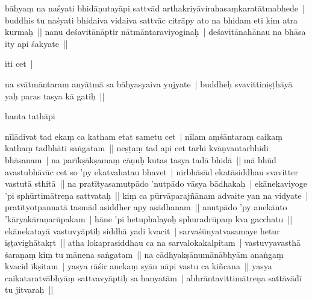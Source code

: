\documentclass[article,12pt,a4paper]{memoir}%
\newcounter{parCount}
\begin{document}
	  
	  \pstart \leavevmode%
	bāhyaṃ na naśyati bhidāṇutayāpi sattvād arthakriyāvirahasaṃkaratātmabhede | buddhis tu naśyati bhidaiva vidaiva sattvāc citrāpy ato na bhidam eti kim atra kurmaḥ ||  nanu deśavitānāptir nātmāntaraviyoginaḥ | deśavitānahānau na bhāsa ity api śakyate ||
	{}
	\pend%
      

	  
	  \pstart \leavevmode%
	iti cet |
	{}
	\pend%
      

	  
	  \pstart \leavevmode%
	na svātmāntaram anyātmā sa bāhyasyaiva yujyate | buddheḥ svavittiniṣṭhāyā yaḥ paras tasya kā gatiḥ || 
	{}
	\pend%
      

	  
	  \pstart \leavevmode%
	hanta tathāpi
	{}
	\pend%
      

	  
	  \pstart \leavevmode%
	nīlādivat tad ekaṃ ca katham etat sametu cet | nīlam aṃśāntaraṃ caikaṃ kathaṃ tadbhāti saṅgatam || neṣṭaṃ tad api cet tarhi kvāṇvantarbhidi bhāsanam | na parīkṣākṣamaṃ cāṇuḥ kutas tasya tadā bhidā || mā bhūd avastubhāvāc cet so 'py ekatvahatau bhavet | nirbhāsād ekatāsiddhau svavitter vastutā sthitā ||  na pratītyasamutpādo 'nutpādo vāsya bādhakaḥ | ekānekaviyoge 'pi sphūrtimātreṇa sattvataḥ || kiṃ ca pūrvāparajñānam advaite yan na vidyate | pratītyotpannatā tasmād asiddher apy asādhanam ||  anutpādo 'py anekānto 'kāryakāraṇarūpakam | hāne 'pi hetuphalayoḥ sphuradrūpaṃ kva gacchatu ||  ekānekatayā vastuvyāptiḥ siddhā yadi kvacit | sarvaśūnyatvasamaye hetur iṣṭavighātakṛt || atha lokaprasiddhau ca na sarvalokakalpitam | vastuvyavasthā śaraṇaṃ kiṃ tu mānena saṅgatam || na cādhyakṣānumānābhyām anaṅgaṃ kvacid īkṣitam | yasya rāśir anekaṃ syān nāpi vastu ca kiñcana ||  yasya caikataratvābhyāṃ sattvavyāptiḥ sa hanyatām | abhrāntavittimātreṇa sattāvādī tu jitvaraḥ || 
	{}
	\pend%
      
\end{document}
